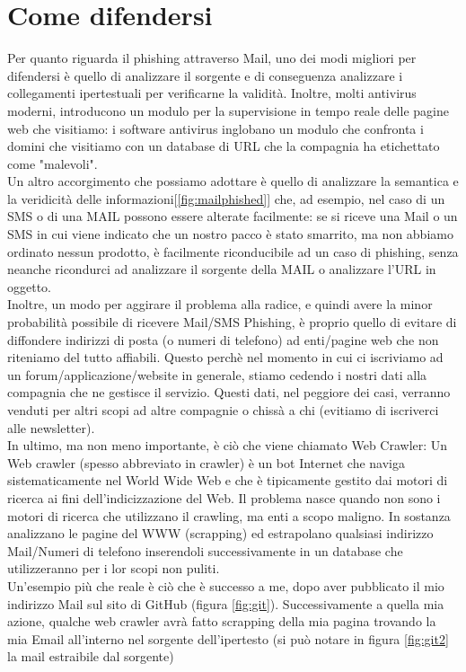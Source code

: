 \section{Come difendersi}
Per quanto riguarda il phishing attraverso Mail, uno dei modi migliori per difendersi è quello di analizzare il sorgente e di conseguenza analizzare i collegamenti ipertestuali per verificarne la validità. Inoltre, molti antivirus moderni, introducono un modulo per la supervisione in tempo reale delle pagine web che visitiamo: i software antivirus inglobano un modulo che confronta i domini che visitiamo con un database di URL che la compagnia ha etichettato come "malevoli"\cite{inproceedings}.\\
Un altro accorgimento che possiamo adottare è quello di analizzare la semantica e la veridicità delle informazioni[\ref{fig:mailphished}] che, ad esempio, nel caso di un SMS o di una MAIL possono essere alterate facilmente: se si riceve una Mail o un SMS in cui viene indicato che un nostro pacco è stato smarrito, ma non abbiamo ordinato nessun prodotto, è facilmente riconducibile ad un caso di phishing, senza neanche ricondurci ad analizzare il sorgente della MAIL o analizzare l'URL in oggetto.\\
Inoltre, un modo per aggirare il problema alla radice, e quindi avere la minor probabilità possibile di ricevere Mail/SMS Phishing, è proprio quello di evitare di diffondere indirizzi di posta (o numeri di telefono) ad enti/pagine web che non riteniamo del tutto affiabili. Questo perchè nel momento in cui ci iscriviamo ad un forum/applicazione/website in generale, stiamo cedendo i nostri dati alla compagnia che ne gestisce il servizio. Questi dati, nel peggiore dei casi, verranno venduti per altri scopi ad altre compagnie o chissà a chi (evitiamo di iscriverci alle newsletter).\\
In ultimo, ma non meno importante, è ciò che viene chiamato Web Crawler: Un Web crawler (spesso abbreviato in crawler) è un bot Internet che naviga sistematicamente nel World Wide Web e che è tipicamente gestito dai motori di ricerca ai fini dell'indicizzazione del Web. Il problema nasce quando non sono i motori di ricerca che utilizzano il crawling, ma enti a scopo maligno. In sostanza analizzano le pagine del WWW (scrapping) ed estrapolano qualsiasi indirizzo Mail/Numeri di telefono inserendoli successivamente in un database che utilizzeranno per i lor scopi non puliti.\\
Un'esempio più che reale è ciò che è successo a me, dopo aver pubblicato il mio indirizzo Mail sul sito di GitHub (figura \ref{fig:git}). Successivamente a quella mia azione, qualche web crawler avrà fatto scrapping della mia pagina trovando la mia Email all'interno nel sorgente dell'ipertesto (si può notare in figura \ref{fig:git2} la mail estraibile dal sorgente)
